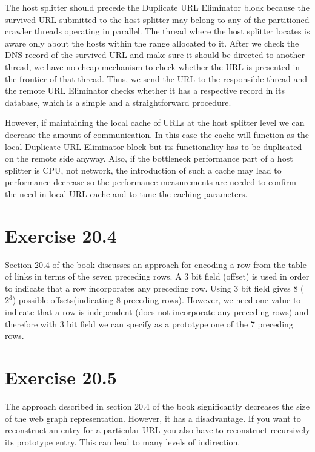 \documentclass[a4paper, notitlepage]{article}
\begin{document}
The host splitter should precede the Duplicate URL Eliminator block because the survived URL submitted to the host splitter may belong to any of the partitioned crawler threads operating in parallel. The thread where the host splitter locates is aware only about the hosts within the range allocated to it. After we check the DNS record of the survived URL and make sure it should be directed to another thread, we have no cheap mechanism to check whether the URL is presented in the frontier of that thread. Thus, we send the URL to the responsible thread and the remote URL Eliminator checks whether it has a respective record in its database, which is a simple and a straightforward procedure.

However, if maintaining the local cache of URLs at the host splitter level we can decrease the amount of communication. In this case the cache will function as the local Duplicate URL Eliminator block but its functionality has to be duplicated on the remote side anyway. Also, if the bottleneck performance part of a host splitter is CPU, not network, the introduction of such a cache may lead to performance decrease so the performance measurements are needed to confirm the need in local URL cache and to tune the caching parameters.

\section{Exercise 20.4}

Section 20.4 of the book discusses an approach for encoding a row from the table of links in terms of the seven preceding rows. A 3 bit field (offset) is used in order to indicate that a row incorporates any preceding row. Using 3 bit field gives 8 ($2^3$) possible offsets(indicating 8 preceding rows). However, we need one value to indicate that a row is independent (does not incorporate any preceding rows) and therefore with 3 bit field we can specify as a prototype one of the 7 preceding rows. 

\section{Exercise 20.5}

The approach described in section 20.4 of the book significantly decreases the size of the web graph representation. However, it has a disadvantage. If you want to reconstruct an entry for a particular URL you also have to reconstruct recursively its prototype entry. This can lead to many levels of indirection. 
\end{document}
